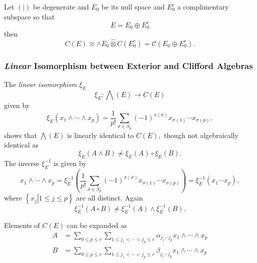 \documentclass[aps,preprint]{revtex4}%
\begin{document}
Let $\left(  \left.  {}\right\vert \right)  $ be degenerate and $E_{0}$ be its
null space and $E_{0}^{c}$ a complimentary subspace so that
\begin{equation}
E=E_{0}\oplus E_{0}^{c}%
\end{equation}
then
\begin{equation}
C\left(  E\right)  \cong\wedge E_{0}\widehat{\otimes}C\left(  E_{0}%
^{c}\right)  =\mathcal{C}\left(  E_{0}\oplus E_{0}^{c}\right)  .
\end{equation}


\subsubsection{\emph{Linear} Isomorphism between Exterior and Clifford
Algebras}

The \emph{linear isomorphism} $\xi_{E}$%
\begin{equation}
\xi_{E}:\bigwedge\left(  E\right)  \rightarrow C\left(  E\right)
\end{equation}
given by
\begin{equation}
\xi_{E}\left(  x_{1}\wedge\cdots\wedge x_{p}\right)  =\frac{1}{p!}\sum
_{\sigma\in S_{p}}\left(  -1\right)  ^{\pi\left(  \sigma\right)  }%
x_{\sigma\left(  1\right)  }\cdots x_{\sigma\left(  p\right)  },
\end{equation}
shows that $\bigwedge\left(  E\right)  $ is linearly identical to $C\left(
E\right)  ,$ though not algebraically identical as%
\begin{equation}
\xi_{E}\left(  A\wedge B\right)  \neq\xi_{E}\left(  A\right)  \circ\xi
_{E}\left(  B\right)  .
\end{equation}
The inverse $\xi_{E}^{-1}$ is given by
\begin{equation}
x_{1}\wedge\cdots\wedge x_{p}=\xi_{E}^{-1}\left(  \frac{1}{p!}\sum_{\sigma\in
S_{p}}\left(  -1\right)  ^{\pi\left(  \sigma\right)  }x_{\sigma\left(
1\right)  }\cdots x_{\sigma\left(  p\right)  }\right)  =\xi_{E}^{-1}\left(
x_{1}\cdots x_{p}\right)  ,
\end{equation}
where $\left\{  \left.  x_{j}\right\vert 1\leq j\leq p\right\}  $ are all
distinct. Again
\begin{equation}
\xi_{E}^{-1}\left(  A\circ B\right)  \neq\xi_{E}^{-1}\left(  A\right)
\wedge\xi_{E}^{-1}\left(  B\right)  .
\end{equation}


Elements of $C\left(  E\right)  $ can be expanded as
\begin{align}
A  &  =\sum_{0\leq p\leq r}\sum_{1\leq j_{1}<\cdots<j_{p}\leq r}\alpha
_{j_{1}\cdots j_{p}}x_{1}\wedge\cdots\wedge x_{p}\\
B  &  =\sum_{0\leq p\leq r}\sum_{1\leq j_{1}<\cdots<j_{p}\leq r}\beta
_{j_{1}\cdots j_{p}}x_{1}\wedge\cdots\wedge x_{p}%
\end{align}
\end{document}
